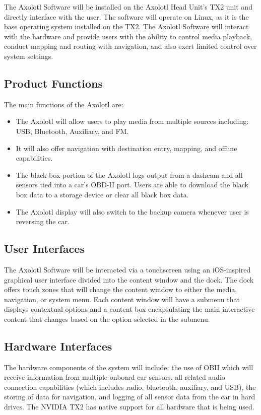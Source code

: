 \documentclass[onecolumn, draftclsnofoot,10pt, compsoc]{IEEEtran}
\begin{document}
The Axolotl Software will be installed on the Axolotl Head Unit’s TX2 unit and directly interface with the user. The software will operate on Linux, as it is the base operating system installed on the TX2. The Axolotl Software will interact with the hardware and provide users with the ability to control media playback, conduct mapping and routing with navigation, and also exert limited control over system settings.\par

\subsection{Product Functions}
The main functions of the Axolotl are:
\begin{itemize}
	\item	The Axolotl will allow users to play media from multiple sources including: USB, Bluetooth, Auxiliary, and FM.
	\item	It will also offer navigation with destination entry, mapping, and offline capabilities. 
	\item	The black box portion of the Axolotl logs output from a dashcam and all sensors tied into a car’s OBD-II port. Users are able to download the black box data to a storage device or clear all black box data. 
	\item	The Axolotl display will also switch to the backup camera whenever user is reversing the car.
	
\end{itemize}
\subsection{User Interfaces}
The Axolotl Software will be interacted via a touchscreen using an iOS-inspired graphical user interface divided into the content window and the dock. The dock offers touch zones that will change the content window to either the media, navigation, or system menu. Each content window will have a submenu that displays contextual options and a content box encapsulating the main interactive content that changes based on the option selected in the submenu.\par
\subsection{Hardware Interfaces}
The hardware components of the system will include: the use of OBII which will receive information from multiple onboard car sensors, all related audio connection capabilities (which includes radio, bluetooth, auxiliary, and USB), the storing of data for navigation, and logging of all sensor data from the car in hard drives. The NVIDIA TX2 has native support for all hardware that is being used. \par
\end{document}
